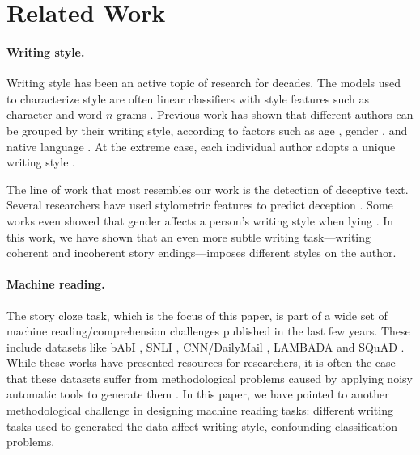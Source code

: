 \documentclass[11pt,a4paper]{article}
\newcommand{\isection}[2]{\section{#1}\label{ssec:#2}}
\newcommand{\com}[1]{}
\newcommand{\resolved}[1]{}
\newcommand{\nascomment}[1]{{\color{blue}\textsc{[#1 --nas]}}}
\renewcommand{\nascomment}[1]{}
\begin{document}
\isection{Related Work}{Related}

\paragraph{Writing style.}
Writing style has been an active topic of research for decades. 
The models used to characterize style are often linear classifiers with style features such as character and word $n$-grams \cite{Stamatatos:2009,Koppel:2009}.
Previous work has shown that different authors can be grouped by their
writing style, according to factors such as age
\cite{Pennebaker:2003,Argamon:2003,Schler:2006,Rosenthal:2011,nguyen:2011:latech},
gender \cite{Argamon:2003,Schler:2006,bamman2014gender}, and native language
\cite{Koppel:2005,Tsur:2007,Bergsma:2012}.
At the extreme case, each individual author adopts a unique writing
style \cite{mosteller1963inference,pennebaker1999linguistic,Schwartz:2013}. 
\com{Interestingly, previous work has shown that individual style can be affected from coarse-grained factors such as those just described, but also from other less apparent factors such as mental state, or even living in a high-elevation location \cite{schwartz2013personality}.

Unlike the works just described which compare the writing style
between different authors, some works have shown that the same author
can adopt a different style used when writing positive vs.~negative
text \cite{Davidov:2010} or when writing sarcastic text \cite{Tsur:2010}. In this work, we have shown that the same author can adopt a different style when facing different writing tasks.}

The line of work that most resembles our work is the detection of deceptive text. 
Several researchers have used stylometric features to  predict deception 
\cite{Newman:2003,hancock2007lying,ott2011finding,Feng:2012}.
Some works even showed that gender affects a person's  writing style when lying \cite{Perez:2014b,Perez:2014a}.
In this work, we have shown that an even more subtle writing task---writing {coherent} and {incoherent} story endings---imposes different styles on the author.


\paragraph{Machine reading.}
The  story cloze task, which is the focus of this paper, is part of a wide set of machine reading/comprehension challenges published in the last few years.
These include datasets like bAbI \cite{Weston:2015}, SNLI \cite{bowman2015large}, CNN/DailyMail \cite{hermann2015teaching}, LAMBADA \cite{Paperno:2016} and SQuAD \cite{rajpurkar2016squad}. 
While these works have presented resources for researchers, 
it is often the case that these datasets suffer from methodological
problems caused by applying noisy automatic tools to generate them \cite{Chen:2016}. 
In this paper, we have pointed to another methodological challenge in
designing machine reading tasks:  different writing tasks
used to generated the data affect writing style, confounding classification problems.
 \resolved{\nascomment{dropped the train/test discrepancy here}}
\end{document}
